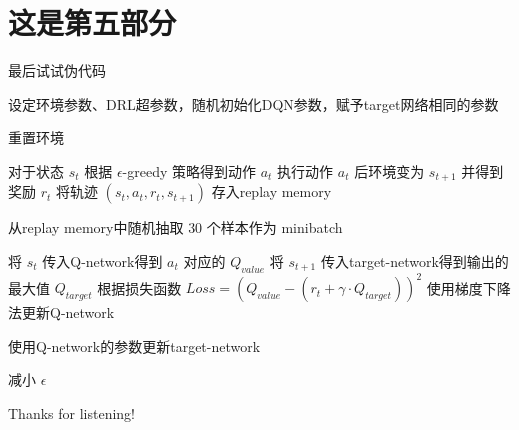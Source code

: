 \documentclass[aspectratio=169]{beamer}
\begin{document}
\section{这是第五部分}

\begin{frame}{最后试试伪代码}

  \scriptsize %
  \begin{algorithmic}[1]
    \setlength{\itemsep}{0.2em} %
    \State 设定环境参数、DRL超参数，随机初始化DQN参数，赋予target网络相同的参数

      \State 重置环境

        \State 对于状态 $s_t$ 根据 $\epsilon$-greedy 策略得到动作 $a_t$
        \State 执行动作 $a_t$ 后环境变为 $s_{t+1}$ 并得到奖励 $r_t$
        \State 将轨迹 $(s_t, a_t, r_t, s_{t+1})$ 存入replay memory

          \State 从replay memory中随机抽取 $30$ 个样本作为 minibatch

            \State 将 $s_t$ 传入Q-network得到 $a_t$ 对应的 $Q_{value}$
            \State 将 $s_{t+1}$ 传入target-network得到输出的最大值 $Q_{target}$
            \State 根据损失函数 $Loss = (Q_{value} - (r_t + \gamma \cdot Q_{target}))^2$ 使用梯度下降法更新Q-network
          \EndFor

            \State 使用Q-network的参数更新target-network
          \EndIf

          \State 减小 $\epsilon$
        \EndIf
      \EndFor
    \EndFor
  \end{algorithmic}

\end{frame}

\begin{frame}

  \centering
  \Huge
  Thanks for listening!

\end{frame}
\end{document}
